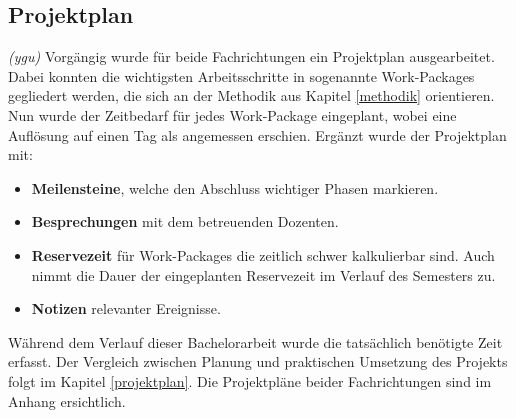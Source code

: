 \subsection{Projektplan}
\textit{(ygu)} Vorgängig wurde für beide Fachrichtungen ein Projektplan ausgearbeitet. Dabei konnten die wichtigsten Arbeitsschritte in sogenannte Work-Packages gegliedert werden, die sich an der Methodik aus Kapitel \ref{methodik} orientieren. Nun wurde der Zeitbedarf für jedes Work-Package eingeplant, wobei eine Auflösung auf einen Tag als angemessen erschien. Ergänzt wurde der Projektplan mit:

\begin{itemize}
	\item \textbf{Meilensteine}, welche den Abschluss wichtiger Phasen markieren.
	
	\item \textbf{Besprechungen} mit dem betreuenden Dozenten.
	
	\item \textbf{Reservezeit} für Work-Packages die zeitlich schwer kalkulierbar sind. Auch nimmt die Dauer der eingeplanten Reservezeit im Verlauf des Semesters zu.
	
	\item \textbf{Notizen} relevanter Ereignisse.
\end{itemize}

Während dem Verlauf dieser Bachelorarbeit wurde die tatsächlich benötigte Zeit erfasst. Der Vergleich zwischen Planung und praktischen Umsetzung des Projekts folgt im Kapitel  \ref{projektplan}. Die Projektpläne beider Fachrichtungen sind im Anhang ersichtlich. 